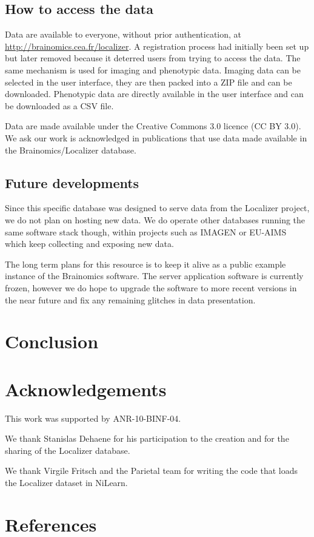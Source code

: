 \documentclass[review]{elsarticle}
\begin{document}
\subsection{How to access the data}

Data are available to everyone, without prior authentication, at \url{http://brainomics.cea.fr/localizer}. A registration process had initially been set up but later removed because it deterred users from trying to access the data. The same mechanism is used for imaging and phenotypic data. Imaging data can be selected in the user interface, they are then packed into a ZIP file and can be downloaded. Phenotypic data are directly available in the user interface and can be downloaded as a CSV file.

Data are made available under the Creative Commons 3.0 licence (CC BY 3.0). We ask our work is acknowledged in publications that use data made available in the Brainomics/Localizer database.


\subsection{Future developments}

Since this specific database was designed to serve data from the Localizer project, we do not plan on hosting new data. We do operate other databases running the same software stack though, within projects such as IMAGEN \cite{Imagen2010} or EU-AIMS \cite{Aims2014} which keep collecting and exposing new data.

The long term plans for this resource is to keep it alive as a public example instance of the {Brainomics} software. The server application software is currently frozen, however we do hope to upgrade the software to more recent versions in the near future and fix any remaining glitches in data presentation.


\section{Conclusion}

\section{Acknowledgements}

This work was supported by ANR-10-BINF-04.

We thank Stanislas Dehaene for his participation to the creation and for the sharing of the Localizer database. 

We thank Virgile Fritsch and the Parietal team for writing the code that loads the Localizer dataset in NiLearn.


\section*{References}


\end{document}
